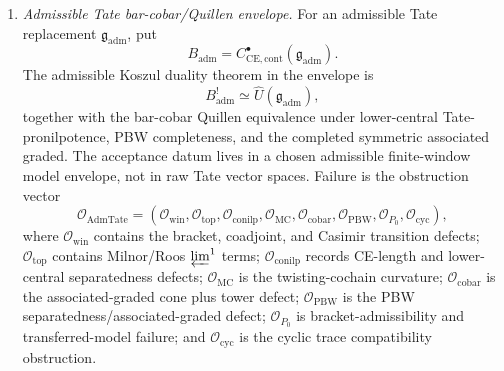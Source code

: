 \begin{enumerate}
  \item \emph{Admissible Tate bar-cobar/Quillen envelope.}
  For an admissible Tate replacement
  \(\mathfrak g_{\mathrm{adm}}\), put
  \[
    B_{\mathrm{adm}}=
    C^\bullet_{\mathrm{CE},\mathrm{cont}}(\mathfrak g_{\mathrm{adm}}).
  \]
  The admissible Koszul duality theorem in the envelope is
  \[
    B_{\mathrm{adm}}^!\simeq
    \widehat U(\mathfrak g_{\mathrm{adm}}),
  \]
  together with the bar-cobar Quillen equivalence under lower-central
  Tate-pronilpotence, PBW completeness, and the completed symmetric
  associated graded.  The acceptance datum lives in a chosen admissible
  finite-window model envelope, not in raw Tate vector spaces.  Failure is
  the obstruction vector
  \[
    \mathcal O_{\mathrm{AdmTate}}
    =
    (\mathcal O_{\mathrm{win}},
     \mathcal O_{\mathrm{top}},
     \mathcal O_{\mathrm{conilp}},
     \mathcal O_{\mathrm{MC}},
     \mathcal O_{\mathrm{cobar}},
     \mathcal O_{\mathrm{PBW}},
     \mathcal O_{P_0},
     \mathcal O_{\mathrm{cyc}}),
  \]
  where \(\mathcal O_{\mathrm{win}}\) contains the bracket, coadjoint,
  and Casimir transition defects; \(\mathcal O_{\mathrm{top}}\) contains
  Milnor/Roos \(\varprojlim^1\) terms; \(\mathcal O_{\mathrm{conilp}}\)
  records CE-length and lower-central separatedness defects;
  \(\mathcal O_{\mathrm{MC}}\) is the twisting-cochain curvature;
  \(\mathcal O_{\mathrm{cobar}}\) is the associated-graded cone plus
  tower defect; \(\mathcal O_{\mathrm{PBW}}\) is the PBW
  separatedness/associated-graded defect; \(\mathcal O_{P_0}\) is
  bracket-admissibility and transferred-model failure; and
  \(\mathcal O_{\mathrm{cyc}}\) is the cyclic trace compatibility
  obstruction.


\end{enumerate}
